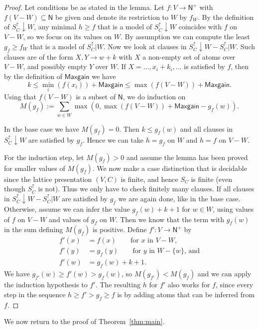 \documentclass[11pt,a4paper]{article}
\newcommand{\N}{\mathsf{N}}
\newcommand\set[1]{\{#1\}}
\newcommand\Ninf{\N^+}
\newcommand\M{\mathsf{Maxgain}}
\begin{document}
\begin{proof}
Let conditions be as stated in the lemma.
Let $f: V\to\Ninf$ with $f(V-W)\subseteq \N$ be given
and denote its restriction to $W$ by $f_W$.
By the definition of $S^\uparrow_C{\downarrow}W$, any minimal $h\geq f$
that is a model of $S^\uparrow_C{\downarrow}W$
coincides with $f$ on $V-W$, so we focus on its values on $W$.
By assumption we can compute the least $g_f \geq f_W$ that 
is a model of $S^\uparrow_C|W$.
Now we look at clauses in $S^\uparrow_C{\downarrow}W - S^\uparrow_C|W$. 
Such clauses are of the form $X,Y \to w+k$ with $X$ a non-empty
set of atoms over $V-W$, and possibly empty $Y$ over $W$. 
If $X = \ldots,x_i+k_i,\ldots$ is satisfied by $f$, 
then by the definition of $\M$ we have
\[
k \leq\min_i(f(x_i)) + \M \leq \max(f(V-W)) + \M.
\]								
Using that $f(V-W)$ is a subset of $\N$, we do induction on 
\[
M(g_f) := \sum_{w \in W}  \max(0, \max(f(V-W)) + \M - g_f(w)).
\] 

In the base case we have $M(g_f)=0$.
Then $k\leq g_f(w)$ and all clauses in $S^\uparrow_C{\downarrow}W$ are 
satisfied by $g_f$.
Hence we can take $h=g_f$ on $W$ and $h=f$ on $V-W$.

For the induction step, let $M(g_f)>0$ and assume
the lemma has been proved for smaller values of $M(g_f)$.
We now make a case distinction that is decidable since
the lattice presentation $(V,C)$ is finite,
and hence $S_C$ is finite (even though $S^\uparrow_C$ is not).
Thus we only have to check finitely many clauses.
If all clauses in $S^\uparrow_C{\downarrow}W - S^\uparrow_C|W$ are satisfied 
by $g_f$ we are again done, like in the base case.
Otherwise, assume we can infer the value $g_f(w)+k+1$
for $w\in W$, using values of $f$ on $V-W$ and values 
of $g_f$ on $W$. Then we know that the term with $g_f(w)$
in the sum defining $M(g_f)$ is positive.
Define $f' : V \to \Ninf$ by 
\begin{align*}
f'(x)&= f(x)   \quad\quad\text{for $x$ in $V-W$,}\\ 
f'(y)&= g_f(y) \quad\quad\text{for $y$ in $W-\set{w}$, and}\\ 
f'(w)&= g_f(w)+k+1. 
\end{align*}
We have $g_{f'}(w) \geq f'(w) > g_f(w)$, so $M(g_{f'}) < M(g_f)$
and we can apply the induction hypothesis to $f'$.
The resulting $h$ for $f'$ also works for $f$,
since every step in the sequence 
$h \geq f' > g_f \geq f$
is by adding atoms that can be inferred from $f$.
\end{proof}

We now return to the proof of Theorem~\ref{thm:main}.
\end{document}
